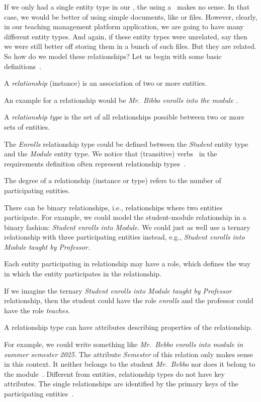 %
%
%
If we only had a single entity type in our \db, the using a \db\ makes no sense.
In that case, we would be better of using simple documents, like  or  files.
However, clearly, in our teaching management platform application, we are going to have many different entity types.
And again, if these entity types were unrelated, say    then we were still better off storing them in a bunch of such files.
But they are related.
So how do we model these relationships?
Let us begin with some basic definitions~\cite{G2011EW2ITDS:CMUTERM}.%
%
\begin{definition}[Relationship]%
A \emph{relationship} (instance) is an association of two or more entities.%
\end{definition}%
%
An example for a relationship would be \emph{Mr.~Bibbo enrolls into the module .}
%
\begin{definition}%
A \emph{relationship type} is the set of all relationships possible between two or more sets of entities.%
\end{definition}%
%
The \emph{Enrolls} relationship type could be defined between the \emph{Student} entity type and the \emph{Module} entity type.
We notice that (transitive) verbs~\cite{EOWM2025MWAMTD:TA} in the requirements definition often represent relationship types~\cite{C1997ECAED}.%
%
\begin{definition}%
\label{def:degreeOfRelationship}%
The degree of a relationship (instance or type) refers to the number of participating entities.%
\end{definition}%
%
There can be binary relationships, i.e., relationships where two entities participate.
For example, we could model the student-module relationship in a binary fashion: \emph{Student enrolls into Module.}
We could just as well use a ternary relationship with three participating entities instead, e.g., \emph{Student enrolls into Module taught by Professor.}
%
\begin{definition}%
Each entity participating in relationship may have a role, which defines the way in which the entity participates in the relationship.%
\end{definition}%
%
If we imagine the ternary \emph{Student enrolls into Module taught by Professor} relationship, then the student could have the role \emph{enrolls} and the professor could have the role \emph{teaches}.%
%
\begin{definition}%
A relationship type can have attributes describing properties of the relationship.%
\end{definition}%
%
For example, we could write something like \emph{Mr.~Bebbo enrolls into module  in summer semester 2025.}
The attribute \emph{Semester} of this relation only makes sense in this context.
It neither belongs to the student \emph{Mr.~Bebbo} nor does it belong to the module~.
Different from entities, relationship types do not have key attributes.
The single relationships are identified by the primary keys of the participating entities~\cite{G2011EW2ITDS:CMUTERM}.

